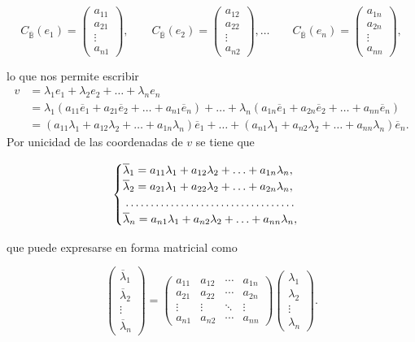 \documentclass[a4paper,10pt]{article}
\theoremstyle{teorema}
\theoremstyle{plano}
\theoremstyle{titulo}
\begin{document}
\[C_{\overline{\mathbb{B}}}(e_1)=\begin{pmatrix}a_{11} \\ a_{21} \\ \vdots \\ a_{n1} \end{pmatrix}, \qquad C_{\overline{\mathbb{B}}}(e_2)=\begin{pmatrix}a_{12} \\ a_{22} \\ \vdots \\ a_{n2} \end{pmatrix},\ldots \qquad C_{\overline{\mathbb{B}}}(e_n)=\begin{pmatrix}a_{1n} \\ a_{2n} \\ \vdots \\ a_{nn} \end{pmatrix},\]

lo que nos permite escribir
\begin{align*}
v&=\lambda_1e_1+\lambda_2e_2+\ldots+\lambda_ne_n\\
&=\lambda_1(a_{11}\overline{e}_1+a_{21}\overline{e}_2+\ldots+a_{n1}\overline{e}_n)+\ldots+\lambda_n(a_{1n}\overline{e}_1+a_{2n}\overline{e}_2+\ldots+a_{nn}\overline{e}_n)\\
&=(a_{11}\lambda_1+a_{12}\lambda_2+\ldots+a_{1n}\lambda_n)\overline e_1+\ldots+(a_{n1}\lambda_1+a_{n2}\lambda_2+\ldots+a_{nn}\lambda_n)\overline e_n.
\end{align*}
Por unicidad de las coordenadas de $v$ se tiene que

\[\begin{cases}
\overline{\lambda}_1=a_{11}\lambda_1+a_{12}\lambda_2+\ldots+a_{1n}\lambda_n, \\
\overline{\lambda}_2=a_{21}\lambda_1+a_{22}\lambda_2+\ldots+a_{2n}\lambda_n, \\
\dotfill \\
\overline{\lambda}_n=a_{n1}\lambda_1+a_{n2}\lambda_2+\ldots+a_{nn}\lambda_n,
\end{cases}\]

que puede expresarse en forma matricial como

\[\begin{pmatrix}\overline{\lambda}_1 \\ \overline{\lambda}_2 \\ \vdots \\ \overline{\lambda}_n\end{pmatrix}=\begin{pmatrix}a_{11} & a_{12} & \cdots & a_{1n} \\
a_{21} & a_{22} & \cdots & a_{2n} \\
\vdots & \vdots & \ddots & \vdots \\
a_{n1} & a_{n2} & \cdots & a_{nn}
\end{pmatrix}\begin{pmatrix}\lambda_1 \\ \lambda_2 \\ \vdots \\ \lambda_n\end{pmatrix}.\]
\end{document}
